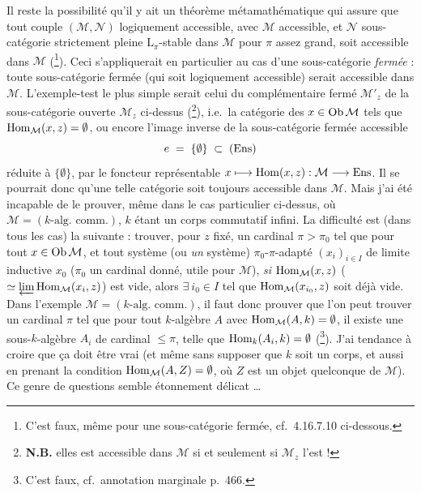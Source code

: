 Il reste la possibilité qu'il y ait un théorème métamathématique qui assure que tout couple $(\mathcal{M},\mathcal{N})$ logiquement accessible, avec $\mathcal{M}$ accessible, et $\mathcal{N}$ sous-catégorie strictement pleine $\mathrm{L}_\pi$-stable dans $\mathcal{M}$ pour $\pi$ assez grand, soit accessible dans $\mathcal{M}$ (\footnote[188]{C'est faux, même pour une sous-catégorie fermée, cf.\ 4.16.7.10 ci-dessous.}). Ceci s'appliquerait en particulier au cas d'une sous-catégorie \textit{fermée} : toute sous-catégorie fermée (qui soit logiquement accessible) serait accessible dans $\mathcal{M}$. L'exemple-test le plus simple serait celui du complémentaire fermé $\mathcal{M}'_z$ de la sous-catégorie ouverte $\mathcal{M}_z$ ci-dessus (\footnote[189]{\textbf{N.B.} elles est accessible dans $\mathcal{M}$ si et seulement si $\mathcal{M}_z$ l'est ! %
}), i.e.\ la catégorie des $x \in \operatorname{Ob}\mathcal{M}$ tels que $\operatorname{Hom}_{\mathcal{M}}(x,z) = \emptyset$, ou encore
l'image inverse de la sous-catégorie fermée accessible
\[
e \;=\; \{\emptyset\} \;\subset\; (\mathrm{Ens})
\]
réduite à $\{\emptyset\}$, par le foncteur représentable $x \longmapsto \operatorname{Hom}(x,z) : \mathcal{M} \longrightarrow \mathrm{Ens}$. Il se pourrait donc qu'une telle catégorie soit toujours accessible dans $\mathcal{M}$. Mais j'ai été incapable de le
prouver, même dans le cas particulier ci-dessus, où $\mathcal{M} = (k\text{-alg.\ comm.})$, $k$ étant un corps commutatif infini. La difficulté est (dans tous les cas) la suivante : trouver, pour $z$ fixé, un cardinal $\pi > \pi_0$ tel que pour tout $x \in \operatorname{Ob}\mathcal{M}$, et tout système (ou \textit{un} système) $\pi_0$-$\pi$-adapté $(x_i)_{i\in I}$ de limite inductive $x_0$ ($\pi_0$ un cardinal donné, utile pour $\mathcal{M}$), \textit{si} $\operatorname{Hom}_{\mathcal{M}}(x,z)$ ($\simeq \varprojlim \operatorname{Hom}_{\mathcal{M}}(x_i,z)$) est vide, alors $\exists\ i_0 \in I$ tel que $\operatorname{Hom}_{\mathcal{M}}(x_{i_0},z)$ soit déjà vide. Dans l'exemple $\mathcal{M} = (k\text{-alg.\ comm.})$, il faut donc prouver que l'on peut trouver un cardinal $\pi$
tel que pour tout $k$-algèbre $A$ avec $\operatorname{Hom}_{\mathcal{M}}(A,k) = \emptyset$, il existe une sous-$k$-algèbre $A_i$ de %
cardinal $\leqslant \pi$, telle que $\operatorname{Hom}_k(A_i,k) = \emptyset$ (\footnote[190]{C'est faux, cf.\ annotation marginale p.~466.}). J'ai tendance à croire que ça doit être vrai (et même sans
supposer que $k$ soit un corps, et aussi en prenant la condition $\operatorname{Hom}_{\mathcal{M}}(A,Z) = \emptyset$, où $Z$ est un objet quelconque de $\mathcal{M}$). Ce genre de questions semble étonnement délicat \dots %

